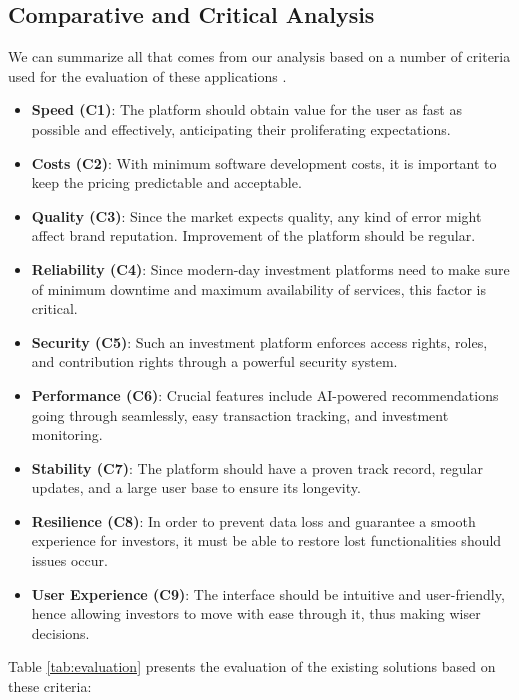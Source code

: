 \subsection{Comparative and Critical Analysis}

We can summarize all that comes from our analysis based on a number of criteria used for the evaluation of these applications \cite{LyssnaUXAnalysis2024, StrategicManagementInsightCA2024}.

\begin{itemize}
    \item \textbf{Speed (C1)}: The platform should obtain value for the user as fast as possible and effectively, anticipating their proliferating expectations.
    \item \textbf{Costs (C2)}: With minimum software development costs, it is important to keep the pricing predictable and acceptable.
    \item \textbf{Quality (C3)}: Since the market expects quality, any kind of error might affect brand reputation. Improvement of the platform should be regular.
    \item \textbf{Reliability (C4)}: Since modern-day investment platforms need to make sure of minimum downtime and maximum availability of services, this factor is critical.
    \item \textbf{Security (C5)}: Such an investment platform enforces access rights, roles, and contribution rights through a powerful security system.
    \item \textbf{Performance (C6)}: Crucial features include AI-powered recommendations going through seamlessly, easy transaction tracking, and investment monitoring.
    \item \textbf{Stability (C7)}: The platform should have a proven track record, regular updates, and a large user base to ensure its longevity.
    \item \textbf{Resilience (C8)}: In order to prevent data loss and guarantee a smooth experience for investors, it must be able to restore lost functionalities should issues occur.
    \item \textbf{User Experience (C9)}: The interface should be intuitive and user-friendly, hence allowing investors to move with ease through it, thus making wiser decisions.
\end{itemize}

Table \ref{tab:evaluation} presents the evaluation of the existing solutions based on these criteria:

